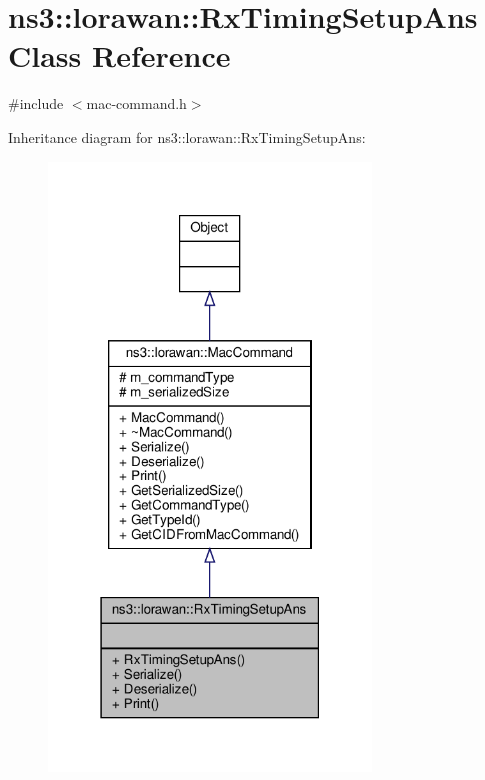 \hypertarget{classns3_1_1lorawan_1_1RxTimingSetupAns}{}\section{ns3\+:\+:lorawan\+:\+:Rx\+Timing\+Setup\+Ans Class Reference}
\label{classns3_1_1lorawan_1_1RxTimingSetupAns}


{\ttfamily \#include $<$mac-\/command.\+h$>$}



Inheritance diagram for ns3\+:\+:lorawan\+:\+:Rx\+Timing\+Setup\+Ans\+:
\nopagebreak
\begin{figure}[H]
\begin{center}
\leavevmode
\includegraphics[width=243pt]{classns3_1_1lorawan_1_1RxTimingSetupAns__inherit__graph}
\end{center}
\end{figure}


